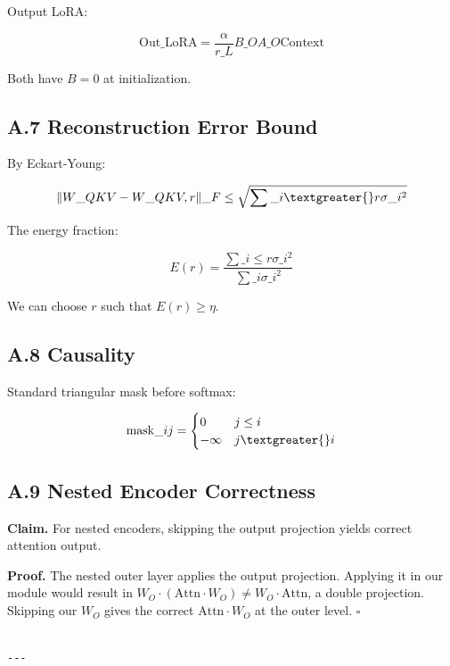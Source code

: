 Output LoRA:

\[
\text{Out}\_\text{LoRA} = \frac{\alpha}{r\_L} B\_O A\_O \text{Context}
\]

Both have $B = 0$ at initialization.

\subsection{A.7 Reconstruction Error Bound}

By Eckart-Young:

\[
\|W\_{QKV} - W\_{QKV, r}\|\_F \leq \sqrt{\sum\_{i \textgreater{} r} \sigma\_i^2}
\]

The energy fraction:

\[
E(r) = \frac{\sum\_{i \leq r} \sigma\_i^2}{\sum\_i \sigma\_i^2}
\]

We can choose $r$ such that $E(r) \geq \eta$.

\subsection{A.8 Causality}

Standard triangular mask before softmax:

\[
\text{mask}\_{ij} = \begin{cases} 0 & j \leq i \\ -\infty & j \textgreater{} i \end{cases}
\]

\subsection{A.9 Nested Encoder Correctness}

\textbf{Claim.} For nested encoders, skipping the output projection yields correct 
attention output.

\textbf{Proof.} The nested outer layer applies the output projection. Applying it 
in our module would result in $W_O \cdot (\text{Attn} \cdot W_O) \neq W_O \cdot \text{Attn}$, 
a double projection. Skipping our $W_O$ gives the correct 
$\text{Attn} \cdot W_O$ at the outer level. $\square$
\begin{lstlisting}

---
\end{lstlisting}